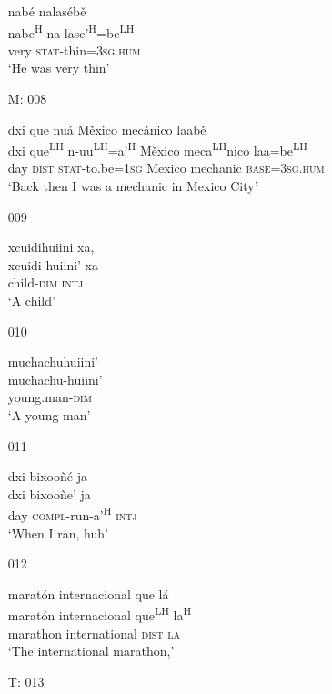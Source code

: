 \begin{itemize}
\glll nab\'{e} nalas\'{e}b\v{e}\\
nabe\textsuperscript{H} na-lase'\textsuperscript{H}=be\textsuperscript{LH} \\
very \textsc{stat}-thin=\textsc{3sg.hum}\\
\glt `He was very thin' 
 

\item[M: 008]
   
\glll dxi que nu\'{a} M\v{e}xico mec\v{a}nico laab\v{e}\\
dxi que\textsuperscript{LH} n-uu\textsuperscript{LH}=a'\textsuperscript{H}  M\v{e}xico meca\textsuperscript{LH}nico laa=be\textsuperscript{LH}\\
day \textsc{dist} \textsc{stat}-to.be=\textsc{1sg} Mexico mechanic \textsc{base}=\textsc{3sg.hum} \\
\glt `Back then I was a mechanic in Mexico City'
 

\item[009]
   
\glll xcuidihuiini xa,\\
xcuidi-huiini' xa \\
child-\textsc{dim} \textsc{intj}\\
\glt `A child'
 

\item[010]
   
\glll muchachuhuiini'\\
muchachu-huiini' \\
young.man-\textsc{dim} \\
\glt `A young man'
 

\item[011]
  
\glll dxi bixoo\~{n}\'{e} ja\\
dxi bixoo\~{n}e' ja\\
day \textsc{compl}-run-a'\textsuperscript{H} \textsc{intj}\\
\glt `When I ran, huh'
 

\item[012]
  
\glll marat\'{o}n internacional que l\'{a}\\
marat\'{o}n internacional que\textsuperscript{LH} la\textsuperscript{H}\\
marathon	international \textsc{dist} \textsc{la}\\
\glt `The international marathon,'
 

\item[T: 013]
    

\end{itemize}
